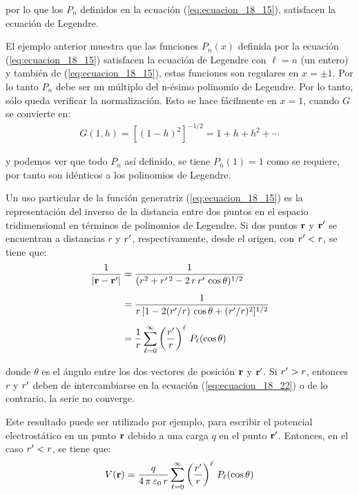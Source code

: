 por lo que los $P_{n}$ definidos en la ecuación (\ref{eq:ecuacion_18_15}), satisfacen la ecuación de Legendre.
\par
El ejemplo anterior muestra que las funciones $P_{n} (x)$ definida por la ecuación (\ref{eq:ecuacion_18_15}) satisfacen la ecuación de Legendre con $\ell = n$ (un entero) y también de (\ref{eq:ecuacion_18_15}), estas funciones son regulares en $x = \pm 1$. Por lo tanto $P_{n}$ debe ser un múltiplo del n-ésimo polinomio de Legendre. Por lo tanto, sólo queda verificar la normalización. Esto se hace fácilmente en $x = 1$, cuando $G$ se convierte en:
\begin{align*}
G(1, h) = [(1 - h)^{2}]^{-1/2} =  1 + h + h^{2} + \cdots
\end{align*}

y podemos ver que todo $P_{n}$ así definido, se tiene $P_{n} (1) = 1$ como se requiere, por tanto son idénticos a los polinomios de Legendre.
\par
Un uso particular de la función generatriz (\ref{eq:ecuacion_18_15}) es la representación del inverso de la distancia entre dos puntos en el espacio tridimensional en términos de polinomios de Legendre. Si dos puntos $\vb{r}$ y ${\vb{r}}^{\prime}$ se encuentran a distancias $r$ y ${r}^{\prime}$, respectivamente, desde el origen, con ${r}^{\prime} < r$, se tiene que:
\begin{align}
\begin{aligned}[b]
\dfrac{1}{\abs{\vb{r} - {\vb{r}}^{\prime}}} &= \dfrac{1}{(r^{2} + r^{\prime \: 2} - 2 \, r \, {r}^{\prime} \, \cos \theta)^{1/2}} \\[0.5em]
&= \dfrac{1}{r \, [ 1 -2 ({r}^{\prime}/r) \, \cos \theta + ({r}^{\prime}/r)^{2}]^{1/2}} \\[0.5em]
&= \dfrac{1}{r} \sum_{\ell = 0}^{\infty} \left( \dfrac{{r}^{\prime}}{r} \right)^{\ell} \, P_{\ell} (\cos \theta)
\end{aligned}
\label{eq:ecuacion_18_22}
\end{align}

donde $\theta$ es el ángulo entre los dos vectores de posición $\vb{r}$ y ${\vb{r}}^{\prime}$. Si ${r}^{\prime} > r$, entonces $r$ y ${r}^{\prime}$ deben de intercambiarse en la ecuación (\ref{eq:ecuacion_18_22}) o de lo contrario, la serie no converge.
\par
Este resultado puede ser utilizado por ejemplo, para escribir el potencial electrostático en un punto $\vb{r}$ debido a una carga $q$ en el punto ${\vb{r}}^{\prime}$. Entonces, en el caso ${r}^{\prime} < r$, se tiene que:
\begin{align*}
V(\vb{r}) = \dfrac{q}{4 \, \pi \, \varepsilon_{0} \, r} \sum_{\ell=0}^{\infty} \left( \dfrac{{r}^{\prime}}{r} \right)^{\ell} \, P_{\ell} (\cos \theta)
\end{align*}

